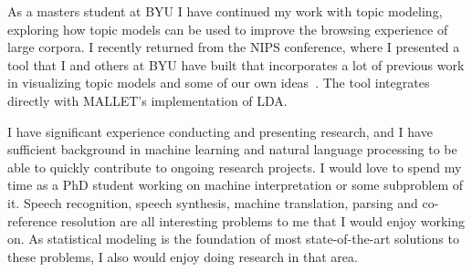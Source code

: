 \documentclass[onecolumn, 12pt]{article}
\begin{document}
As a masters student at BYU I have continued my work with topic modeling,
exploring how topic models can be used to improve the browsing experience of
large corpora.  I recently returned from the NIPS conference, where I presented
a tool that I and others at BYU have built that incorporates a lot of previous
work in visualizing topic models and some of our own
ideas~\cite{gardner-2010-topic-browser}.  The tool integrates directly with
MALLET's implementation of LDA.

I have significant experience conducting and presenting research, and I have
sufficient background in machine learning and natural language processing to be
able to quickly contribute to ongoing research projects.  I would love to spend
my time as a PhD student working on machine interpretation or some subproblem
of it.  Speech recognition, speech synthesis, machine translation, parsing and
co-reference resolution are all interesting problems to me that I would enjoy
working on.  As statistical modeling is the foundation of most state-of-the-art
solutions to these problems, I also would enjoy doing research in that area.

\vspace{2mm}
\footnotesize

\renewcommand\bibsection{\noindent \small\textbf{Publications}\vspace{-2mm}\footnotesize}

\end{document}
